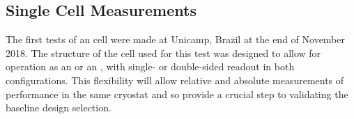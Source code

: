 

\subsection{Single Cell  Measurements}
\label{sec:xarapuca-unicamp}

The first tests of an  cell were made at Unicamp, Brazil at the end of November 2018. 
The structure of the cell used for this test was designed to allow for operation as an  or an , with single- or double-sided readout in both configurations.  This flexibility will allow relative and absolute measurements of performance in the same cryostat and so provide a crucial step to validating the baseline design selection.

